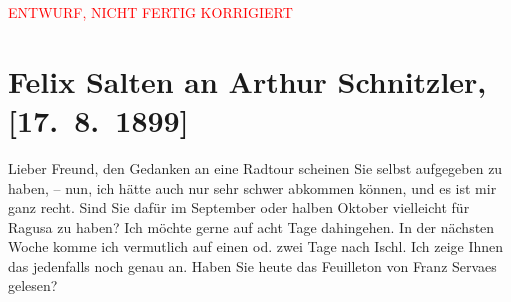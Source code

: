 
\begin{center}
            \textcolor{red}{ENTWURF, NICHT FERTIG KORRIGIERT}
                      \end{center}
            
         
         \renewcommand{\erwaehntePersonen}{Personen: Richard Beer-Hofmann, Houston Stewart Chamberlain, Ottilie Salten, Franz Servaes, Karl von Thaler}
         \renewcommand{\erwaehnteInstitutionen}{Institutionen: Neue Freie Presse}
         \renewcommand{\erwaehnteOrte}{Orte: Bad Ischl, Dubrovnik}
         \renewcommand{\erwaehnteWerke}{Werke: Decadence-Romane, Die Grundlagen des neunzehnten Jahrhunderts, Neue Freie Presse}
               \section[Felix Salten an Arthur Schnitzler, {[}17. 8. 1899{]}]{ Felix Salten an Arthur Schnitzler, {[}17. 8. 1899{]}}\nopagebreak{}\rehead{ }\begin{ledgroupsized}[t]{13cm}\normalsize\beginnumbering \toendnotes[C]{\smallbreak\pagebreak[2]} 
\toendnotes[C]{\smallbreak}\pstart
           \noindent{}{\pb}Lieber Freund, den Gedanken an eine Radtour scheinen Sie selbst
               aufgegeben zu haben, – nun, ich hätte auch nur sehr schwer abkommen können, und es
               ist mir ganz recht. Sind Sie dafür im September oder halben Oktober vielleicht für
               Ragusa zu haben? Ich möchte gerne auf acht Tage
               dahingehen. In der nächsten Woche komme ich vermutlich auf einen od. zwei Tage nach
                  Ischl. Ich zeige Ihnen das jedenfalls noch
               genau an. Haben Sie heute das Feuilleton von Franz Servaes gelesen?

\end{ledgroupsized}
